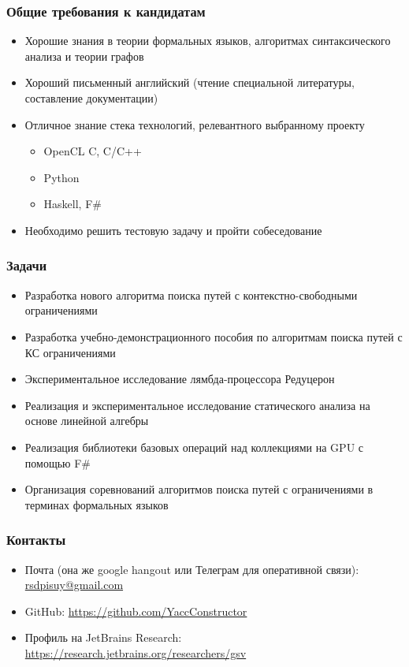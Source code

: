 \documentclass[aspectratio=169]{beamer}
\begin{document}
\begin{frame}[fragile]
\frametitle{Общие требования к кандидатам}
  
  \begin{itemize}
    \item Хорошие знания в теории формальных языков, алгоритмах синтаксического анализа и теории графов
    \item Хороший письменный английский (чтение специальной литературы, составление документации)
    \item Отличное знание стека технологий, релевантного выбранному проекту
    \begin{itemize}
    \item OpenCL C, C/C++
    \item Python
    \item Haskell, F\#
    \end{itemize}
    \item Необходимо решить тестовую задачу и пройти собеседование
  \end{itemize}
\end{frame}

\begin{frame}[fragile]
  \frametitle{Задачи}
    \begin{itemize}
      \item Разработка нового алгоритма поиска путей с контекстно-свободными ограничениями
      \item Разработка учебно-демонстрационного пособия по алгоритмам поиска путей с КС ограничениями
      \item Экспериментальное исследование лямбда-процессора Редуцерон
      \item Реализация и экспериментальное исследование статического анализа на основе линейной алгебры
      \item Реализация библиотеки базовых операций над коллекциями на GPU с помощью F\#
      \item Организация соревнований алгоритмов поиска путей с ограничениями в терминах формальных языков
    \end{itemize}
  \end{frame}

  
\begin{frame}
\frametitle{Контакты}
\begin{itemize}
  \item Почта (она же google hangout или Телеграм для оперативной связи): \url{rsdpisuy@gmail.com}
  \item GitHub: \url{https://github.com/YaccConstructor}
  \item Профиль на JetBrains Research: \url{https://research.jetbrains.org/researchers/gsv}
\end{itemize}
\end{frame}
\end{document}
